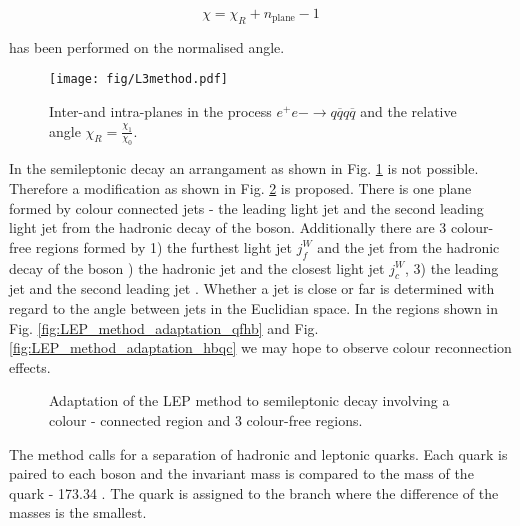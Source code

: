 \begin{equation}
  \chi=\chi_{R}+n_{\text{plane}}-1
\end{equation}

has been performed on the normalised angle. 

\begin{figure}[hbtp]
  \centering
  \texttt{[image: fig/L3method.pdf]}
  \caption{Inter-\PW and intra-\PW planes in the process $e^{+}e{-}\rightarrow q\overline{q}q\overline{q}$ and the relative angle $\chi_{R}=\frac{\chi_{1}}{\chi_{0}}$.}
  \label{fig:LEP_method}
\end{figure}

In the \ttbar semileptonic decay an arrangament as shown in Fig. \ref{fig:LEP_method} is not possible. Therefore a modification as shown in Fig. \ref{fig:LEP_method_adaptation} is proposed. There is one plane formed by colour connected jets - the leading light jet \leadingjet and the second leading light jet \scndleadingjet from the hadronic decay of the \PW boson. Additionally there are 3 colour-free regions formed by 1) the furthest light jet $j^{W}_{f}$ and the \cPqb jet from the hadronic decay of the \PW boson ) the hadronic \cPqb jet and the closest light jet $j^{W}_{c}$, 3) the leading \cPqb jet \leadingb and the second leading \cPqb jet \scndleadingb. Whether a jet is close or far is determined with regard to the angle between jets in the Euclidian space. In the regions shown in Fig. \ref{fig:LEP_method_adaptation_qfhb} and Fig. \ref{fig:LEP_method_adaptation_hbqc} we may hope to observe colour reconnection effects.

\begin{figure}[hbtp]
  \centering
  \def\twidth{0.24}
  \caption{Adaptation of the LEP method to \ttbar semileptonic decay involving a colour - connected region and 3 colour-free regions.}
  \label{fig:LEP_method_adaptation}
\end{figure}

The method calls for a separation of hadronic and leptonic \cPqb quarks. Each \cPqb quark is paired to each \PW boson and the invariant mass is compared to the mass of the \cPqt quark - 173.34 \GeV. The \cPqb quark is assigned to the branch where the difference of the masses is the smallest. 

